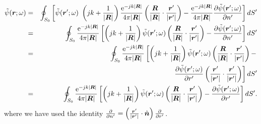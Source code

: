 \begin{eqnarray}
\label{eq:SphereIntNF2FF2}
\tilde{\psi}(\mbfit{r}; \omega) &= & \oint_{S_0} \left [  \tilde{\psi}(\mbfit{r'}; \omega) \ \left ( jk + \frac{1}{|\mbfit{R}|} \right )  \frac{\mrm{e}^{-jk|\mbfit{R}|}}{4\pi|\mbfit{R}|} \left ( \frac{\mbfit{R}}{|\mbfit{R}|} \cdot \frac{\mbfit{r'}}{|\mbfit{r'}|}  \right )  -  \frac{\mrm{e}^{-jk|\mbfit{R}|}}{4\pi|\mbfit{R}|} \frac{\partial{\tilde{\psi}(\mbfit{r'}; \omega)}}{\partial{n'}} \right ] dS' \nonumber \\
&= & \oint_{S_0} \frac{\mrm{e}^{-jk|\mbfit{R}|}}{4\pi|\mbfit{R}|} \left [ \left ( jk + \frac{1}{|\mbfit{R}|} \right )  \tilde{\psi}(\mbfit{r'}; \omega)  \left ( \frac{\mbfit{R}}{|\mbfit{R}|} \cdot \frac{\mbfit{r'}}{|\mbfit{r'}|} \right )  -  \frac{\partial{\tilde{\psi}(\mbfit{r'}; \omega)}}{\partial{n'}} \right ]  dS' \nonumber \\
&= & \oint_{S_0} \frac{\mrm{e}^{-jk|\mbfit{R}|}}{4\pi|\mbfit{R}|} \left [ \left ( jk + \frac{1}{|\mbfit{R}|} \right ) \tilde{\psi}(\mbfit{r'}; \omega)  \left ( \frac{\mbfit{R}}{|\mbfit{R}|} \cdot \frac{\mbfit{r'}}{|\mbfit{r'}|} \right )  - \right. \nonumber \\
& &  \hspace{1cm} \left. \frac{\partial{\tilde{\psi}(\mbfit{r'}; \omega)}}{\partial{r'}} \left ( \frac{\mbfit{r'}}{|\mbfit{r'}|} \cdot \frac{\mbfit{r'}}{|\mbfit{r'}|} \right ) \right ] dS' \nonumber \\
&= & \oint_{S_0} \frac{\mrm{e}^{-jk|\mbfit{R}|}}{4\pi|\mbfit{R}|}  \left [ \left ( jk + \frac{1}{|\mbfit{R}|} \right ) \tilde{\psi}(\mbfit{r'}; \omega)  \left ( \frac{\mbfit{R}}{|\mbfit{R}|} \cdot \frac{\mbfit{r'}}{|\mbfit{r'}|} \right )  - \frac{\partial{\tilde{\psi}(\mbfit{r'}; \omega)}}{\partial{r'}} \right ] dS'.
\end{eqnarray}  where we have used the identity $\frac{\partial}{\partial{n'}} =  \left ( \frac{\mbfit{r'}}{|\mbfit{r'}|} \cdot \hat{\mbfit{n}} \right ) \frac{\partial}{\partial{r'}}$.

